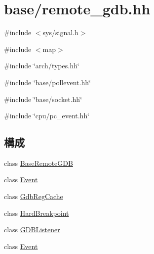 \hypertarget{base_2remote__gdb_8hh}{
\section{base/remote\_\-gdb.hh}
\label{base_2remote__gdb_8hh}
}
{\ttfamily \#include $<$sys/signal.h$>$}\par
{\ttfamily \#include $<$map$>$}\par
{\ttfamily \#include \char`\"{}arch/types.hh\char`\"{}}\par
{\ttfamily \#include \char`\"{}base/pollevent.hh\char`\"{}}\par
{\ttfamily \#include \char`\"{}base/socket.hh\char`\"{}}\par
{\ttfamily \#include \char`\"{}cpu/pc\_\-event.hh\char`\"{}}\par
\subsection*{構成}
\begin{DoxyCompactItemize}
\item 
class \hyperlink{classBaseRemoteGDB}{BaseRemoteGDB}
\item 
class \hyperlink{classBaseRemoteGDB_1_1Event}{Event}
\item 
class \hyperlink{classBaseRemoteGDB_1_1GdbRegCache}{GdbRegCache}
\item 
class \hyperlink{classBaseRemoteGDB_1_1HardBreakpoint}{HardBreakpoint}
\item 
class \hyperlink{classGDBListener}{GDBListener}
\item 
class \hyperlink{classGDBListener_1_1Event}{Event}
\end{DoxyCompactItemize}
